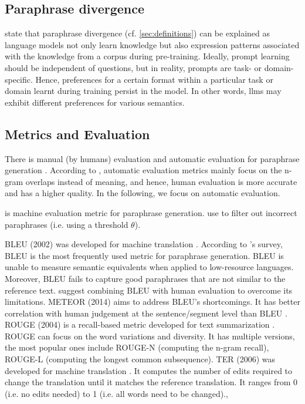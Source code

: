 \subsection{Paraphrase divergence}
\citet{fu_learning_2024} state that paraphrase divergence (cf. \autoref{sec:definitions}) can be explained as language models 
not only learn knowledge but also expression patterns associated with the knowledge from a corpus during pre-training.
Ideally, prompt learning should be independent of questions, but in reality, prompts are task- or domain-specific.
Hence, preferences for a certain format within a particular task or domain learnt during training persist in the model.
In other words, \acp{llm} may exhibit different preferences for various semantics.

\subsection{Metrics and Evaluation}
There is manual (by humans) evaluation and automatic evaluation for paraphrase generation \cite{fu_learning_2024,zhou_paraphrase_2021}.
According to \citet{zhou_paraphrase_2021}, automatic evaluation metrics mainly focus on the n-gram overlaps instead of meaning, 
and hence, human evaluation is more accurate and has a higher quality.
In the following, we focus on automatic evaluation.

\bluert{} is machine evaluation metric for paraphrase generation.
\citet{fu_learning_2024} use \bluert{} to filter out incorrect paraphrases (i.e. using a threshold $\theta$).

BLEU (2002) was developed for machine translation \cite{zhou_paraphrase_2021}.
According to \citet{zhou_paraphrase_2021}'s survey, BLEU is the most frequently used metric for paraphrase generation.
BLEU is unable to measure semantic equivalents when applied to low-resource languages.
Moreover, BLEU fails to capture good paraphrases that are not similar to the reference text.
\citet{zhou_paraphrase_2021} suggest combining BLEU with human evaluation to overcome its limitations.
METEOR (2014) aims to address BLEU's shortcomings.
It has better correlation with human judgement at the sentence/segment level than BLEU \cite{zhou_paraphrase_2021}.
ROUGE (2004) is a recall-based metric developed for text summarization \cite{zhou_paraphrase_2021}.
ROUGE can focus on the word variations and diversity.
It has multiple versions, the most popular ones include ROUGE-N (computing the n-gram recall), 
ROUGE-L (computing the longest common subsequence).
TER (2006) was developed for machine translation \cite{zhou_paraphrase_2021}.
It computes the number of edits required to change the translation until it matches the reference translation.
It ranges from 0 (i.e. no edits needed) to 1 (i.e. all words need to be changed).,


